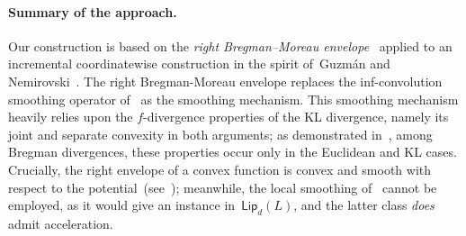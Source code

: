 \documentclass[11pt]{article}
\numberwithin{equation}{section}
\let\le\leqslant
\theoremstyle{remark}
\newcommand{\Ent}{\textup{\textsf{Ent}}}
\let\Div\relax\newcommand{\Div}{D_h}
\newcommand{\Fh}{\Ent_d}
\newcommand{\Vh}{\textsf{Lip}_d}
\newcommand{\Simp}{\Delta_d}
\newcommand{\1}{\mathbf{1}}
\begin{document}
\paragraph{Summary of the approach.}
Our construction is based on the {\em right Bregman--Moreau envelope}~\cite{BauschkeDaoLindstrom2018} applied to an incremental coordinatewise construction in the spirit of~Guzm\'an and Nemirovski~\cite{GuzmanNemirovski2015}.
The right Bregman-Moreau envelope replaces the inf-convolution smoothing operator of~\cite{GuzmanNemirovski2015} as the smoothing mechanism.
This smoothing mechanism heavily relies upon the $f$-divergence properties of the KL divergence, namely its joint and separate convexity in {both} arguments;
as demonstrated in~\cite{BauschkeBorwein2001}, among Bregman divergences, these properties occur only in
the Euclidean and KL cases.
Crucially, the right envelope of a convex function is convex and smooth with respect to the potential~(see~\cite{BauschkeDaoLindstrom2018});
meanwhile, the local smoothing of~\cite{GuzmanNemirovski2015} cannot be employed, as it would give an instance in~$\Vh(L)$, and the latter class {\em does} admit acceleration. 



\end{document}
